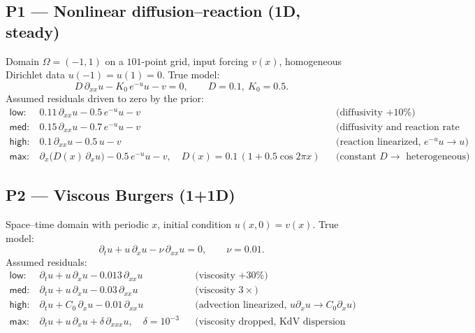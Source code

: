 \documentclass[11pt]{article}
\newcommand{\dom}{\Omega}
\newcommand{\dt}{\partial_t}
\newcommand{\dx}{\partial_x}
\newcommand{\dxx}{\partial_{xx}}
\newcommand{\dxxx}{\partial_{xxx}}
\begin{document}
\subsection*{P1 --- Nonlinear diffusion--reaction (1D, steady)}
Domain $\dom=(-1,1)$ on a $101$-point grid, input forcing $v(x)$, homogeneous Dirichlet data
$u(-1)=u(1)=0$. True model:
\begin{equation}
D\,\dxx u - K_0\, e^{-u} u - v = 0,
\qquad D=0.1,\ K_0=0.5 .
\end{equation}
Assumed residuals driven to zero by the prior:
\begin{align*}
\textsf{low:}\ & 0.11\,\dxx u - 0.5\,e^{-u} u - v
&&\text{(diffusivity $+10\%$)}\\
\textsf{med:}\ & 0.15\,\dxx u - 0.7\,e^{-u} u - v
&&\text{(diffusivity and reaction rate off)}\\
\textsf{high:}\ & 0.1\,\dxx u - 0.5\, u - v
&&\text{(reaction linearized, $e^{-u}u\!\to\!u$)}\\
\textsf{max:}\ & \dx\!\big(D(x)\,\dx u\big) - 0.5\,e^{-u} u - v,\quad D(x)=0.1\,(1+0.5\cos 2\pi x)
&&\text{(constant $D\!\to\!$ heterogeneous)}
\end{align*}

\subsection*{P2 --- Viscous Burgers (1+1D)}
Space--time domain with periodic $x$, initial condition $u(x,0)=v(x)$.
True model:
\begin{equation}
\dt u + u\,\dx u - \nu\,\dxx u = 0, \qquad \nu = 0.01 .
\end{equation}
Assumed residuals:
\begin{align*}
\textsf{low:}\ & \dt u + u\,\dx u - 0.013\,\dxx u &&\text{(viscosity $+30\%$)}\\
\textsf{med:}\ & \dt u + u\,\dx u - 0.03\,\dxx u &&\text{(viscosity $3\times$)}\\
\textsf{high:}\ & \dt u + C_0\,\dx u - 0.01\,\dxx u &&\text{(advection linearized, $u\dx u\!\to\!C_0\dx u$)}\\
\textsf{max:}\ & \dt u + u\,\dx u + \delta\,\dxxx u,\quad \delta=10^{-3} &&\text{(viscosity dropped, KdV dispersion added)}
\end{align*}
\end{document}
